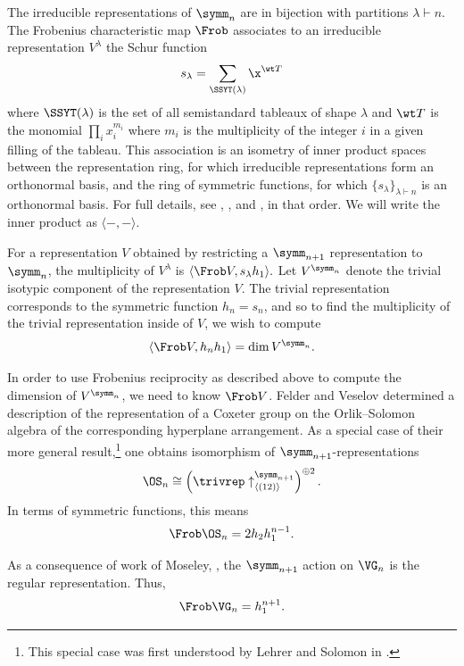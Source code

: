 \documentclass{amsart}
\begin{document}
The irreducible representations of $\symm_n$ are in bijection with partitions $\lambda \vdash n$.
The Frobenius characteristic map $\Frob$ associates to an irreducible representation $V^\lambda$ the Schur function
\[s_\lambda = \sum_{\SSYT(\lambda)} \x^{\wt T}\]
where $\SSYT(\lambda)$ is the set of all semistandard tableaux of shape $\lambda$ and $\wt T$ is the monomial $\prod_i x_i^{m_i}$ where $m_i$ is the multiplicity of the integer $i$ in a given filling of the tableau.
This association is an isometry of inner product spaces between the representation ring, for which irreducible representations form an orthonormal basis, and the ring of symmetric functions, for which $\{s_\lambda\}_{\lambda\vdash n}$ is an orthonormal basis. 
For full details, see \cite{sagan}, \cite[Chapter~7]{ec2}, and \cite{macdonald}, in that order.
We will write the inner product as $\langle -, -\rangle$.

For a representation $V$ obtained by restricting a $\symm_{n+1}$ representation to $\symm_n$, the multiplicity of $V^\lambda$ is $\langle \Frob V, s_\lambda h_1 \rangle.$
Let $V^{\symm_n}$ denote the trivial isotypic component of the representation $V$.
The trivial representation corresponds to the symmetric function $h_n = s_n$, and so to find the multiplicity of the trivial representation inside of $V$, we wish to compute
\begin{equation*}
\langle \Frob V, h_n h_1 \rangle = \dim V^{\symm_n}.
\end{equation*}

In order to use Frobenius reciprocity as described above to compute the dimension of $V^{\symm_n}$, we need to know $\Frob V$.
Felder and Veselov \cite[p.~103]{felder-veselov} determined a description of the representation of a Coxeter group on the Orlik--Solomon algebra of the corresponding hyperplane arrangement. 
As a special case of their more general result,\footnote{This special case was first understood by Lehrer and Solomon in \cite{lehrer-solomon}.} one obtains isomorphism of $\symm_{n+1}$-representations
\[\OS_n \cong \left( \trivrep \uparrow_{\langle (12) \rangle}^{\symm_{n+1}} \right)^{\oplus 2}.\]
In terms of symmetric functions, this means 
\begin{equation}\Frob \OS_n = 2h_2h_1^{n-1}.\end{equation}

As a consequence of work of Moseley, \cite[Proposition~6.1]{moseley}, the $\symm_{n+1}$ action on $\VG_n$ is the regular representation. Thus,
\begin{equation}
    \Frob \VG_n = h_1^{n+1}.
\end{equation}
\end{document}
